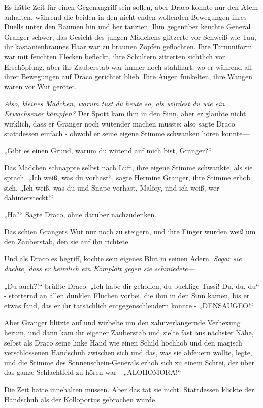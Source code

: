 {Es hätte Zeit für einen Gegenangriff sein sollen, aber Draco konnte nur den Atem anhalten, während die beiden in den nicht enden wollenden Bewegungen ihres Duells unter den Bäumen hin und her tanzten. Ihm gegenüber keuchte General Granger schwer, das Gesicht des jungen Mädchens glitzerte vor Schweiß wie Tau, ihr kastanienbraunes Haar war zu braunen Zöpfen geflochten. Ihre Tarnuniform war mit feuchten Flecken befleckt, ihre Schultern zitterten sichtlich vor Erschöpfung, aber ihr Zauberstab war immer noch stahlhart, wo er während all ihrer Bewegungen auf Draco gerichtet blieb. Ihre Augen funkelten, ihre Wangen waren vor Wut gerötet.

\emph{Also, kleines Mädchen, warum tust du heute so, als würdest du wie ein Erwachsener kämpfen?} Der Spott kam ihm in den Sinn, aber er glaubte nicht wirklich, dass er Granger noch wütender machen musste; also sagte Draco stattdessen einfach - obwohl er seine eigene Stimme schwanken hören konnte—

„Gibt es einen Grund, warum du wütend auf mich bist, Granger?“

Das Mädchen schnappte selbst nach Luft, ihre eigene Stimme schwankte, als sie sprach. „Ich weiß, was du vorhast“, sagte Hermine Granger, ihre Stimme erhob sich. „Ich weiß, was du und Snape vorhast, Malfoy, und ich weiß, wer dahintersteckt!“

„Hä?“ Sagte Draco, ohne darüber nachzudenken.

Das schien Grangers Wut nur noch zu steigern, und ihre Finger wurden weiß um den Zauberstab, den sie auf ihn richtete.

Und als Draco es begriff, kochte sein eigenes Blut in seinen Adern. \emph{Sogar sie dachte, dass er heimlich ein Komplott gegen sie schmiedete—}

„Du auch?!“ brüllte Draco. „Ich habe dir geholfen, du bucklige Tussi! Du, du, du“ - stotternd an allen dunklen Flüchen vorbei, die ihm in den Sinn kamen, bis er etwas fand, das er ihr tatsächlich entgegenschleudern konnte - „DENSAUGEO!“

Aber Granger blitzte auf und wirbelte um den zahnverlängernde Verhexung herum, und dann kam ihr eigener Zauberstab und zielte fast aus nächster Nähe, selbst als Draco seine linke Hand wie einen Schild hochhob und den magisch verschlossenen Handschuh zwischen sich und das, was sie abfeuern wollte, legte, und die Stimme des Sonnenschein-Generals erhob sich zu einem Schrei, der über das ganze Schlachtfeld zu hören war - „ALOHOMORA!“

Die Zeit hätte innehalten müssen. Aber das tat sie nicht. Stattdessen klickte der Handschuh als der Kolloportus gebrochen wurde.

}

